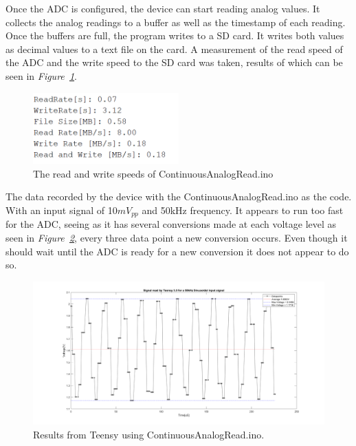 Once the ADC is configured, the device can start reading analog values.
It collects the analog readings to a buffer as well as the timestamp of each reading.
Once the buffers are full, the program writes to a SD card.
It writes both values as decimal values to a text file on the card.
A measurement of the read speed of the ADC and the write speed to the SD card was taken, results of which can be seen in \textit{Figure~\ref{fig:ContAnalSpeed}}.

\begin{figure}[h]
    \centering
    \includegraphics[width=0.50\textwidth]{graphics/ContinousReadSpeed.png}
    \caption{The read and write speeds of ContinuousAnalogRead.ino}
    \label{fig:ContAnalSpeed}
\end{figure}


The data recorded by the device with the ContinuousAnalogRead.ino as the code. 
With an input signal of 10$mV_{pp}$ and 50kHz frequency. 
It appears to run too fast for the ADC, seeing as it has several conversions made at each voltage level as seen in \textit{Figure~\ref{fig:ContAnalREsults}}, every three data point a new conversion occurs.
Even though it should wait until the ADC is ready for a new conversion it does not appear to do so.


\begin{figure}[h]
    \centering
    \includegraphics[width=1.0\textwidth]{graphics/COntANalogResults.png}
    \caption{Results from Teensy using ContinuousAnalogRead.ino.}
    \label{fig:ContAnalREsults}
\end{figure}

